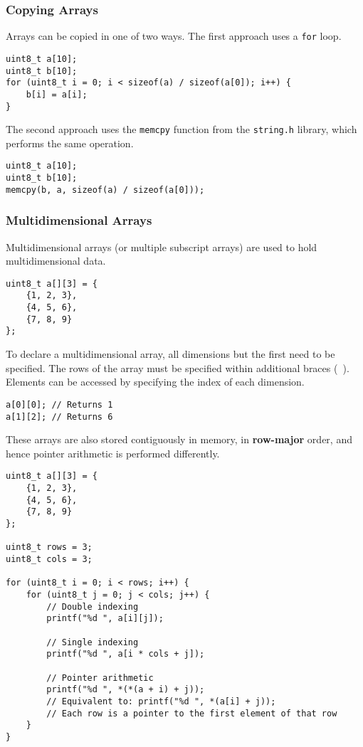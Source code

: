 \documentclass{article}
\begin{document}
\subsubsection{Copying Arrays}
Arrays can be copied in one of two ways. The first approach uses a
\texttt{for} loop.
\begin{verbatim}
uint8_t a[10];
uint8_t b[10];
for (uint8_t i = 0; i < sizeof(a) / sizeof(a[0]); i++) {
    b[i] = a[i];
}
\end{verbatim}
The second approach uses the \texttt{memcpy} function from the
\texttt{string.h} library, which performs the same operation.
\begin{verbatim}
uint8_t a[10];
uint8_t b[10];
memcpy(b, a, sizeof(a) / sizeof(a[0]));
\end{verbatim}
\subsubsection{Multidimensional Arrays}
Multidimensional arrays (or multiple subscript arrays) are used to hold
multidimensional data.
\begin{verbatim}
uint8_t a[][3] = {
    {1, 2, 3},
    {4, 5, 6},
    {7, 8, 9}
};
\end{verbatim}
To declare a multidimensional array, all dimensions but the first need
to be specified. The rows of the array must be specified within
additional braces (\texttt{{ }}). Elements can be accessed by
specifying the index of each dimension.
\begin{verbatim}
a[0][0]; // Returns 1
a[1][2]; // Returns 6
\end{verbatim}
These arrays are also stored contiguously in memory, in
\textbf{row-major} order, and hence pointer arithmetic is performed
differently.
\begin{verbatim}
uint8_t a[][3] = {
    {1, 2, 3},
    {4, 5, 6},
    {7, 8, 9}
};

uint8_t rows = 3;
uint8_t cols = 3;

for (uint8_t i = 0; i < rows; i++) {
    for (uint8_t j = 0; j < cols; j++) {
        // Double indexing
        printf("%d ", a[i][j]);

        // Single indexing
        printf("%d ", a[i * cols + j]);

        // Pointer arithmetic
        printf("%d ", *(*(a + i) + j));
        // Equivalent to: printf("%d ", *(a[i] + j));
        // Each row is a pointer to the first element of that row
    }
}
\end{verbatim}
\end{document}
